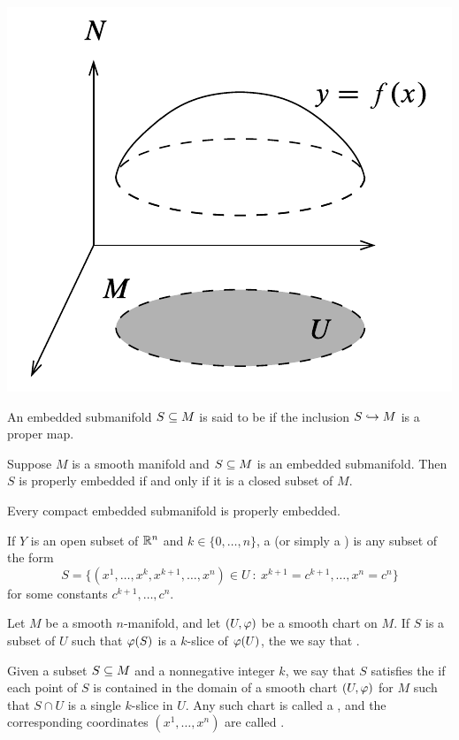 \begin{center}
    \includegraphics[scale = 0.5]{chapter05/c5f1.png}
\end{center}

\dfn An embedded submanifold $S\subseteq M$ is said to be  if the inclusion $S\hookrightarrow M$ is a proper map.

\begin{prop}
Suppose $M$ is a smooth manifold \wowob and $S\subseteq M$ is an embedded submanifold. Then $S$ is properly embedded if and only if it is a closed subset of $M$.
\end{prop}

\begin{cor}
Every compact embedded submanifold is properly embedded.
\end{cor}

\dfn If $Y$ is an open subset of $\mathbb{R}^n$ and $k\in \{0,\ldots,n\}$, a  (or simply a ) is any subset of the form
\[S = \{(x^1,\ldots,x^k,x^{k + 1},\ldots, x^n)\in U\ :\ x^{k + 1} = c^{k + 1},\ldots,x^n = c^n\}\]
for some constants $c^{k + 1},\ldots,c^n$.

\dfn Let $M$ be a smooth $n$-manifold, and let $(U,\varphi)$ be a smooth chart on $M$. If $S$ is a subset of $U$ such that $\varphi(S)$ is a $k$-slice of $\varphi(U)$, the we say that .

\dfn Given a subset $S\subseteq M$ and a nonnegative integer $k$, we say that $S$ satisfies the  if each point of $S$ is contained in the domain of a smooth chart $(U, \varphi)$ for $M$ such that $S\cap U$ is a single $k$-slice in $U$. Any such chart is called a , and the corresponding coordinates $(x^1,\ldots,x^n)$ are called .

